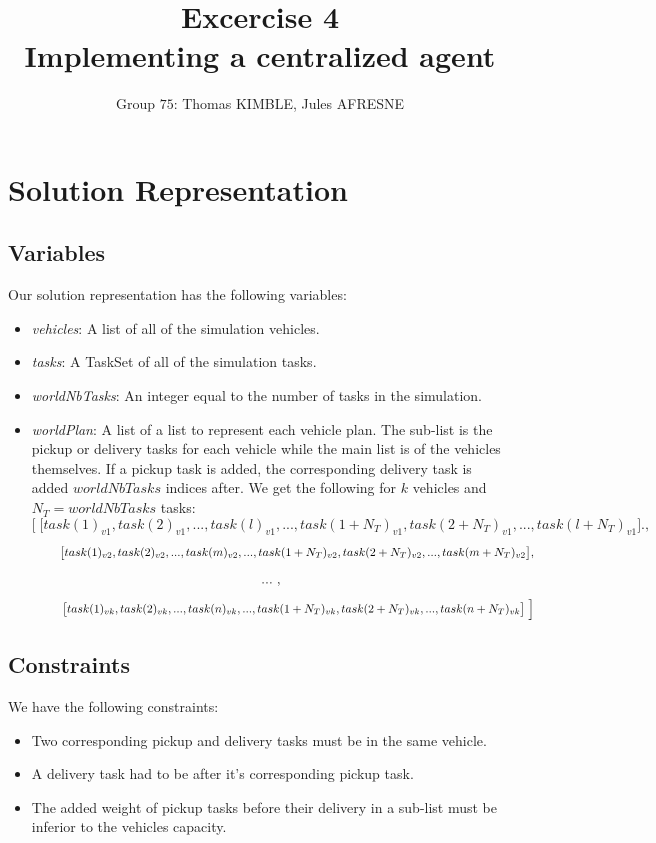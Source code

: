 \documentclass[11pt]{article}
\title{\bf Excercise 4\\ Implementing a centralized agent}
\author{Group \textnumero$75$: Thomas KIMBLE, Jules AFRESNE}
\begin{document}
\maketitle

\section{Solution Representation}

\subsection{Variables}

Our solution representation has the following variables:
\begin{itemize}
    \item \textit{vehicles}: A list of all of the simulation vehicles.
    \item \textit{tasks}: A TaskSet of all of the simulation tasks.
    \item \textit{worldNbTasks}: An integer equal to the number of tasks in the simulation.
    \item \textit{worldPlan}: A list of a list to represent each vehicle plan. The sub-list is the pickup or delivery tasks for each vehicle while the main list is of the vehicles themselves. If a pickup task is added, the corresponding delivery task is added $worldNbTasks$ indices after. We get the following for $k$ vehicles and $N_T = worldNbTasks$ tasks:\\ 
    \[ 
    \Big[ \; \big[ task(1)_{v1},  task(2)_{v1},  ..., task(l)_{v1}, ... , task(1+N_T)_{v1},  task(2+N_T)_{v1},  ..., task(l+N_T)_{v1} \big] \Big. ,
    \]
    \[ 
    \\ \; \; \; \;\; \; \; \; \big[ task(1)_{v2},  task(2)_{v2},  ..., task(m)_{v2}, ... , task(1+N_T)_{v2},  task(2+N_T)_{v2},  ..., task(m+N_T)_{v2} \big] ,
    \]
    \[ 
    \\ \\ ... \; ,
    \]
    \[ 
    \\ \; \; \; \; \; \; \; \; \; \Big. \big[ task(1)_{vk},  task(2)_{vk},  ..., task(n)_{vk}, ... , task(1+N_T)_{vk},  task(2+N_T)_{vk},  ..., task(n+N_T)_{vk}  \big] \; \Big]
    \]
\end{itemize}

\subsection{Constraints}
We have the following constraints:
\begin{itemize}
    \item Two corresponding pickup and delivery tasks must be in the same vehicle.
    \item A delivery task had to be after it's corresponding pickup task.
    \item The added weight of pickup tasks before their delivery in a sub-list must be inferior to the vehicles capacity.
\end{itemize}
\end{document}
